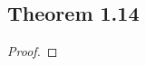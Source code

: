 \documentclass[../../main.tex]{subfiles}
\begin{document}
\subsection{Theorem 1.14}
\begin{wts}

\end{wts}
\begin{proof}

\end{proof}
\end{document}
